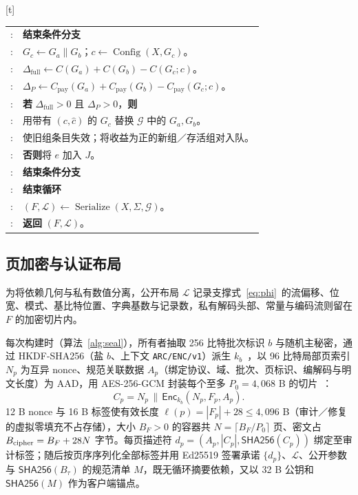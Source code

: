 \documentclass[10pt,journal]{IEEEtran}
\makeatletter
\newcounter{algorithm}
\newenvironment{algorithm}[1][t]{\@float{algorithm}[#1]%
  \long\def\@makecaption##1##2{%
    \par\hrule height .8pt\kern2pt
    {\normalfont\normalsize\noindent\textbf{##1:} ##2\par}%
    \kern2pt\hrule height .8pt\kern2pt}%
}{\end@float}
\newcounter{algline}
\newcommand{\al}{\stepcounter{algline}\thealgline:}
\makeatother
\begin{document}
\begin{algorithm}[t]
\begin{tabular}{@{}r@{\enspace} >{\raggedright\arraybackslash}p{}@{}}
\al & \hspace*{1em}\textbf{结束条件分支}\\
\al & \hspace*{1em}$G_c\gets G_a\mathbin{\|}G_b$；$c\gets\operatorname{Config}(X,G_c)$。\\
\al & \hspace*{1em}$\Delta_{\mathrm{full}}\gets C(G_a)+C(G_b)-C(G_c;c)$。\\
\al & \hspace*{1em}$\Delta_P\gets C_{\mathrm{pay}}(G_a)+C_{\mathrm{pay}}(G_b)-C_{\mathrm{pay}}(G_c;c)$。\\
\al & \hspace*{1em}\textbf{若} $\Delta_{\mathrm{full}}>0$ 且 $\Delta_P>0$，\textbf{则}\\
\al & \hspace*{2em}用带有 $(c,\widehat c)$ 的 $G_c$ 替换 $\mathcal G$ 中的 $G_a,G_b$。\\
\al & \hspace*{2em}使旧组条目失效；将收益为正的新组／存活组对入队。\\
\al & \hspace*{1em}\textbf{否则}将 $e$ 加入 $J$。\\
\al & \hspace*{1em}\textbf{结束条件分支}\\
\al & \textbf{结束循环}\\
\al & $(F,\mathcal L)\gets\operatorname{Serialize}(X,\Sigma,\mathcal G)$。\\
\al & \textbf{返回} $(F,\mathcal L)$。\\\bottomrule
\end{tabular}\end{algorithm}

\subsection{页加密与认证布局}\label{sec:seal}
为将依赖几何与私有数值分离，公开布局 $\mathcal L$ 记录支撑式~\eqref{eq:phi}~的流偏移、位宽、模式、基比特位置、字典基数与记录数，私有解码头部、常量与编码流则留在 $F$ 的加密切片内。

每次构建时（算法~\ref{alg:seal}），所有者抽取 256 比特批次标识 $b$ 与随机主秘密，通过 HKDF-SHA256（盐 $b$、上下文 \texttt{ARC/ENC/v1}）派生 $k_b$~\cite{RFC5869}，以 96 比特局部页索引 $N_p$ 为互异 nonce、规范关联数据 $A_p$（绑定协议、域、批次、页标识、编解码与明文长度）为 AAD，用 AES-256-GCM 封装每个至多 $P_0=4{,}068$ B 的切片~\cite{RFC5116}：
\begin{equation}\label{eq:cipher}
C_p=N_p\,\|\,\mathsf{Enc}_{k_b}(N_p,F_p,A_p).
\end{equation}
12 B nonce 与 16 B 标签使有效长度 $\ell(p)=|F_p|+28\leq4{,}096$ B（审计／修复的虚拟零填充不占存储），大小 $B_F>0$ 的容器共 $N=\lceil B_F/P_0\rceil$ 页、密文占 $B_{\rm cipher}=B_F+28N$ 字节。每页描述符 $d_p=(A_p,|C_p|,\mathsf{SHA256}(C_p))$ 绑定至审计标签；随后按页序序列化全部标签并用 Ed25519 签署承诺 $\{d_p\}$、$\mathcal L$、公开参数与 $\mathsf{SHA256}(B_\tau)$ 的规范清单 $M$，既无循环摘要依赖，又以 32 B 公钥和 $\mathsf{SHA256}(M)$ 作为客户端锚点。
\end{document}
